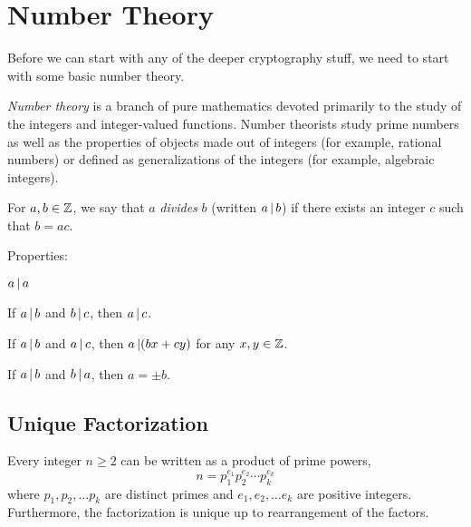 \section{Number Theory}\label{sec:Number_Theory}
Before we can start with any of the deeper cryptography stuff, we need to start with some basic number theory.
\begin{definition}\label{def:Number_Theory}
  \emph{Number theory} is a branch of pure mathematics devoted primarily to the study of the integers and integer-valued functions.
  Number theorists study prime numbers as well as the properties of objects made out of integers (for example, rational numbers) or defined as generalizations of the integers (for example, algebraic integers).
\end{definition}

\begin{definition}[Divides]\label{def:Divides}
  For $a, b \in \operatorname{\mathbb{Z}}$, we say that $a$ \emph{divides} $b$ (written $a \operatorname{\vert} b$) if there exists an integer $c$ such that $b = ac$.

  Properties:
  \begin{propertylist}
  \item $a \operatorname{\vert} a$
  \item If $a \operatorname{\vert} b$ and $b \operatorname{\vert} c$, then $a \operatorname{\vert} c$.
  \item If $a \operatorname{\vert} b$ and $a \operatorname{\vert} c$, then $a \operatorname{\vert} (bx + cy)$ for any $x, y \in \operatorname{\mathbb{Z}}$.
  \item If $a \operatorname{\vert} b$ and $b \operatorname{\vert} a$, then $a = \pm b$.
  \end{propertylist}
\end{definition}









\subsection{Unique Factorization}\label{subsec:Unique_Factorization}
\begin{theorem}\label{thm:Unique_Factorization_Theorem}
  Every integer $n \geq 2$ can be written as a product of prime powers,
  \begin{equation*}
    n = p_{1}^{e_{1}} p_{2}^{e_{2}} \cdots p_{k}^{e_{k}}
  \end{equation*}
  where $p_{1}, p_{2}, \ldots p_{k}$ are distinct primes and $e_{1}, e_{2}, \ldots e_{k}$ are positive integers.
  Furthermore, the factorization is unique up to rearrangement of the factors.
\end{theorem}

